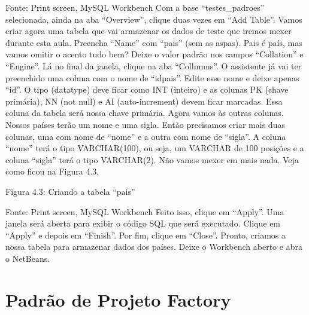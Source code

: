 Fonte: Print screen, MySQL Workbench
Com a base “testes\_padroes” selecionada, ainda na aba “Overview”, clique duas vezes em “Add Table”. Vamos criar agora uma tabela que vai armazenar os dados de teste que iremos mexer durante esta aula. Preencha “Name” com “pais” (sem as aspas). Pais é país, mas vamos omitir o acento tudo bem? Deixe o valor padrão nos campos “Collation” e “Engine”. Lá no final da janela, clique na aba “Collumns”. O assistente já vai ter preenchido uma coluna com o nome de “idpais”. Edite esse nome e deixe apenas “id”. O tipo (datatype) deve ficar como INT (inteiro) e as colunas PK (chave primária), NN (not null) e AI (auto-increment) devem ficar marcadas. Essa coluna da tabela será nossa chave primária. Agora vamos às outras colunas. Nossos países terão um nome e uma sigla. Então precisamos criar mais duas colunas, uma com nome de “nome” e a outra com nome de “sigla”. A coluna “nome” terá o tipo VARCHAR(100), ou seja, um VARCHAR de 100 posições e a coluna “sigla” terá o tipo VARCHAR(2). Não vamos mexer em mais nada. Veja como ficou na Figura 4.3.


Figura 4.3: Criando a tabela “pais”
 
Fonte: Print screen, MySQL Workbench
Feito isso, clique em “Apply”. Uma janela será aberta para exibir o código SQL que será executado. Clique em “Apply” e depois em “Finish”. Por fim, clique em “Close”. Pronto, criamos a nossa tabela para armazenar dados dos países. Deixe o Workbench aberto e abra o NetBeans. 


\section{Padrão de Projeto Factory}

